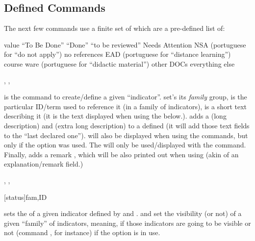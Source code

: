 \documentclass[article,nogeometry,english,tocdepth=3,secdepth=3]{ufrgscca} %
\begin{document}
\subsection{Defined Commands}

The next few commands use a finite set of  which are a pre-defined list of:
\begin{describelist*}{value}
     { “To Be Done”}
     { “Done”}
     { “to be reviewed”}
     { Needs Attention}
     { NSA (portuguese for “do not apply”)}
     { no references}
     { EAD (portuguese for “distance learning”)}
     { course ware (portuguese for “didactic material”) }
     { other DOCs}
     { everything else}
\end{describelist*}

\begin{codedescribe}{\declareindicator, \indicatorDesc, \indicatorText}
	\begin{codesyntax}%
		\tsobj{\declareindicator}\tsverb{*+}
	\end{codesyntax}
\tsmacro{\declareindicator}{} is the command to create/define a given “indicator”.  set's its \emph{family} group,  is the particular ID/term used to reference it (in a family of indicators),  is a short text describing it (it is the text displayed when using the \tsmacro{\indref}{} below.). \tsmacro{\indicatorDesc}{} adds a  (long description) and  (extra long description) to a defined \tsmacro{\declareindicator}{} (it will add those text fields to the “last declared one”).  will also be displayed when using the \tsmacro{\indref}{} commands, but only if the  option was used. The  will only be used/displayed with the \tsmacro{\PrintIndicators}{} command. Finally, \tsmacro{\indicatorText}{} adds a remark , which will be also printed out when using  \tsmacro{\lstind}{} (akin of an explanation/remark field.)
\end{codedescribe}

\begin{codedescribe}{\indsetstatus, \indsetview, \indsethide}
	\begin{codesyntax}%
	\tsmacro{\indsetstatus}[status]{fam,ID}
	\tsmacro{\indsetview}{fam}
	\tsmacro{\indsethide}{fam}
\end{codesyntax}
 sets the  of a given indicator defined by  and . \tsmacro{\indsetview}{} and  set the visibility (or not) of a given “family” of indicators, meaning, if those indicators are going to be visible or not (command \tsmacro{\indref}{}, for instance) if the option  is in use.
\end{codedescribe}
\end{document}
